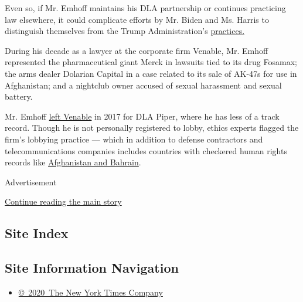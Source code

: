 Even so, if Mr. Emhoff maintains his DLA partnership or continues
practicing law elsewhere, it could complicate efforts by Mr. Biden and
Ms. Harris to distinguish themselves from the Trump Administration's
\href{https://www.nytimes3xbfgragh.onion/2019/10/18/climate/trump-cabinet-lobbyists.html}{practices.}

During his decade as a lawyer at the corporate firm Venable, Mr. Emhoff
represented the pharmaceutical giant Merck in lawsuits tied to its drug
Fosamax; the arms dealer Dolarian Capital in a case related to its sale
of AK-47s for use in Afghanistan; and a nightclub owner accused of
sexual harassment and sexual battery.

Mr. Emhoff
\href{https://www.dlapiper.com/en/us/news/2017/09/dla-piper-adds-leading-litigator-douglas-emhoff/}{left
Venable} in 2017 for DLA Piper, where he has less of a track record.
Though he is not personally registered to lobby, ethics experts flagged
the firm's lobbying practice --- which in addition to defense
contractors and telecommunications companies includes countries with
checkered human rights records like
\href{https://efile.fara.gov/docs/3712-Supplemental-Statement-20200330-32.pdf}{Afghanistan
and Bahrain}.

Advertisement

\protect\hyperlink{after-bottom}{Continue reading the main story}

\hypertarget{site-index}{%
\subsection{Site Index}\label{site-index}}

\hypertarget{site-information-navigation}{%
\subsection{Site Information
Navigation}\label{site-information-navigation}}

\begin{itemize}
\tightlist
\item
  \href{https://help.nytimes3xbfgragh.onion/hc/en-us/articles/115014792127-Copyright-notice}{©~2020~The
  New York Times Company}
\end{itemize}

